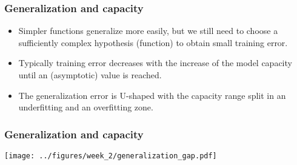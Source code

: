 \documentclass[notes]{beamer}          %
\newif\iffull
\begin{document}
\iffull
\begin{frame}
\frametitle{Overfitting and underfitting in polynomial estimation}
    \begin{itemize}
        \item Models with low capacity are not up to the task.
        \item Models with high-capacity can solve a complex task, but when the capacity is too high for the concrete (training) task there is the danger of overfitting.
        \item In our example: the linear function is unable to capture the curvature so it undefits.
        \item The degree-12 predictor is capable of fitting the training data, but it also able to find infinitely many functions that pass through the same points, so it has high probability of overfitting.
        \item The degree-4 function is the right solution and it generalizes well on the new data.
    \end{itemize}
\end{frame}
\fi

\begin{frame}
\frametitle{Generalization and capacity}
    \begin{itemize}
        \item Simpler functions generalize more easily, but we still need to choose a sufficiently complex hypothesis (function) to obtain small training error.
        \item Typically training error decreases with the increase of the model capacity until an (asymptotic) value is reached.
        \item The generalization error is U-shaped with the capacity range split in an underfitting and an overfitting zone\iffull (see next slide)\fi.
    \end{itemize}
\end{frame}


\begin{frame}
\frametitle{Generalization and capacity}
    \begin{center}
        \texttt{[image: ../figures/week\_2/generalization\_gap.pdf]}
    \end{center}
\end{frame}
\end{document}
